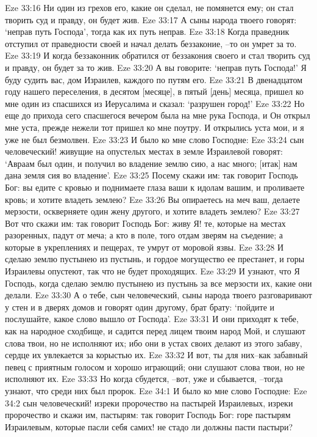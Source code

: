 Eze 33:16  Ни один из грехов его, какие он сделал, не помянется ему; он стал творить суд и правду, он будет жив.
Eze 33:17  А сыны народа твоего говорят: `неправ путь Господа', тогда как их путь неправ.
Eze 33:18  Когда праведник отступил от праведности своей и начал делать беззаконие, --то он умрет за то.
Eze 33:19  И когда беззаконник обратился от беззакония своего и стал творить суд и правду, он будет за то жив.
Eze 33:20  А вы говорите: `неправ путь Господа!' Я буду судить вас, дом Израилев, каждого по путям его.
Eze 33:21  В двенадцатом году нашего переселения, в десятом [месяце], в пятый [день] месяца, пришел ко мне один из спасшихся из Иерусалима и сказал: `разрушен город!'
Eze 33:22  Но еще до прихода сего спасшегося вечером была на мне рука Господа, и Он открыл мне уста, прежде нежели тот пришел ко мне поутру. И открылись уста мои, и я уже не был безмолвен.
Eze 33:23  И было ко мне слово Господне:
Eze 33:24  сын человеческий! живущие на опустелых местах в земле Израилевой говорят: `Авраам был один, и получил во владение землю сию, а нас много; [итак] нам дана земля сия во владение'.
Eze 33:25  Посему скажи им: так говорит Господь Бог: вы едите с кровью и поднимаете глаза ваши к идолам вашим, и проливаете кровь; и хотите владеть землею?
Eze 33:26  Вы опираетесь на меч ваш, делаете мерзости, оскверняете один жену другого, и хотите владеть землею?
Eze 33:27  Вот что скажи им: так говорит Господь Бог: живу Я! те, которые на местах разоренных, падут от меча; а кто в поле, того отдам зверям на съедение; а которые в укреплениях и пещерах, те умрут от моровой язвы.
Eze 33:28  И сделаю землю пустынею из пустынь, и гордое могущество ее престанет, и горы Израилевы опустеют, так что не будет проходящих.
Eze 33:29  И узнают, что Я Господь, когда сделаю землю пустынею из пустынь за все мерзости их, какие они делали.
Eze 33:30  А о тебе, сын человеческий, сыны народа твоего разговаривают у стен и в дверях домов и говорят один другому, брат брату: `пойдите и послушайте, какое слово вышло от Господа'.
Eze 33:31  И они приходят к тебе, как на народное сходбище, и садится перед лицем твоим народ Мой, и слушают слова твои, но не исполняют их; ибо они в устах своих делают из этого забаву, сердце их увлекается за корыстью их.
Eze 33:32  И вот, ты для них--как забавный певец с приятным голосом и хорошо играющий; они слушают слова твои, но не исполняют их.
Eze 33:33  Но когда сбудется, --вот, уже и сбывается, --тогда узнают, что среди них был пророк.
Eze 34:1  И было ко мне слово Господне:
Eze 34:2  сын человеческий! изреки пророчество на пастырей Израилевых, изреки пророчество и скажи им, пастырям: так говорит Господь Бог: горе пастырям Израилевым, которые пасли себя самих! не стадо ли должны пасти пастыри?
